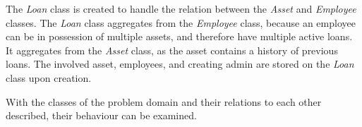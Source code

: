 The \textit{Loan} class is created to handle the relation between the \textit{Asset} and \textit{Employee} classes. The \textit{Loan} class aggregates from the \textit{Employee} class, because an employee can be in possession of multiple assets, and therefore have multiple active loans. It aggregates from the \textit{Asset} class, as the asset contains a history of previous loans. The involved asset, employees, and creating admin are stored on the \textit{Loan} class upon creation.
\newline
\par

With the classes of the problem domain and their relations to each other described, their behaviour can be examined.